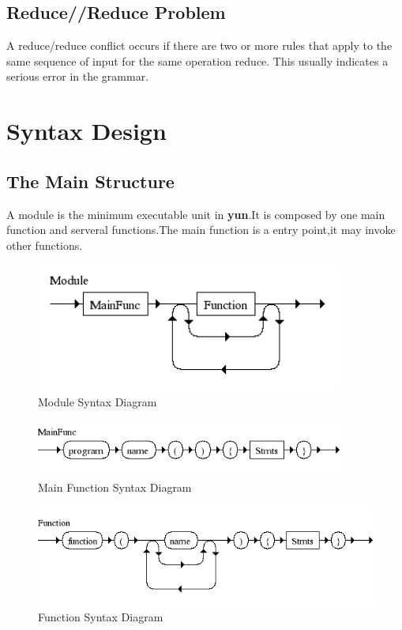 \subsection{Reduce//Reduce Problem}
A reduce/reduce conflict occurs if there are two or more rules that
apply to the same sequence of input for the same operation reduce.  This usually indicates a serious
error in the grammar.


\section{Syntax Design}

\subsection{The Main Structure}
A module is the minimum executable unit in \textbf{yun}.It is composed by one main function and serveral functions.The main function is a entry point,it may invoke other functions.

\begin{figure}[h!]
  \centering
	\includegraphics[width=0.90\textwidth]{pic/c4/module.png}
	\caption{Module Syntax Diagram}
\end{figure}

\begin{figure}[h!]
  \centering
	\includegraphics[width=0.90\textwidth]{pic/c4/main_function.png}
	\caption{Main Function Syntax Diagram}
\end{figure}

\begin{figure}[h!]
  \centering
	\includegraphics[width=1.00\textwidth]{pic/c4/function.png}
	\caption{Function Syntax Diagram}
\end{figure}


